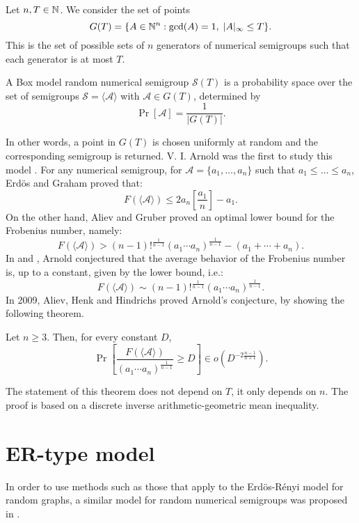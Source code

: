 Let $n, T \in \mathbb{N}$. We consider the set of points
\[G(T) = \{A\in \mathbb{N}^n : \mathrm{gcd}(A) = 1, \; |A|_\infty \leq T\}.\]
This is the set of possible sets of $n$ generators of numerical semigroups such that each generator is at most $T$. 
\begin{definition}\label{def:randnumsems:boxmodel}
    A Box model random numerical semigroup $\mathcal{S}(T)$ is a probability space over the set of semigroups $\mathcal{S} = \langle\mathcal{A}\rangle$ with $\mathcal{A} \in G(T)$, determined by
    \[\Pr[ \mathcal{A}] = \frac{1}{|G(T)|}.\]
\end{definition}
In other words, a point in $G(T)$ is chosen uniformly at random and the corresponding semigroup is returned. V. I. Arnold was the first to study this model \cite{arnold1999weak}. For any numerical semigroup, for $\mathcal{A} = \{a_1, \ldots, a_n\}$ such that $a_1 \leq \ldots \leq a_n$, Erdös and Graham \cite{erdos1972linear} proved that: 
\[F(\langle\mathcal{A} \rangle)  \leq 2 a_n\left[\frac{a_1}{n}\right]  - a_1.\]
On the other hand, Aliev and Gruber \cite{aliev2007optimal} proved an optimal lower bound for the Frobenius number, namely:
\[F(\langle\mathcal{A} \rangle)  > (n - 1)!^{\frac{1}{n - 1}}(a_1\cdots a_n)^{\frac{1}{n - 1}} - (a_1 + \cdots + a_n).\]
In \cite{arnold1999weak} and \cite{arnold2004arnold}, Arnold conjectured that the average behavior of the Frobenius number is, up to a constant, given by the lower bound, i.e.:
\[F(\langle\mathcal{A}\rangle) \sim (n - 1)!^{\frac{1}{n - 1}}(a_1\cdots a_n)^{\frac{1}{n - 1}}.\]
In 2009, Aliev, Henk and Hindrichs \cite{aliev2011expected} proved Arnold's conjecture, by showing the following theorem. 
\begin{theorem} Let $n \geq 3$. Then, for every constant $D$,
    \[\Pr\left[\frac{F(\langle\mathcal{A}\rangle)}{(a_1\cdots a_n)^{\frac{1}{n - 1}}}\geq D\right]  \in o(D^{-2\frac{n - 1}{n + 1}}).\]
\end{theorem}
The statement of this theorem does not depend on $T$, it only depends on $n$. The proof is based on a discrete inverse arithmetic-geometric mean inequality.

\section{ER-type model}

In order to use methods such as those that apply to the Erdös-Rényi model for random graphs, a similar model for random numerical semigroups was proposed in \cite{de2018random}. 

